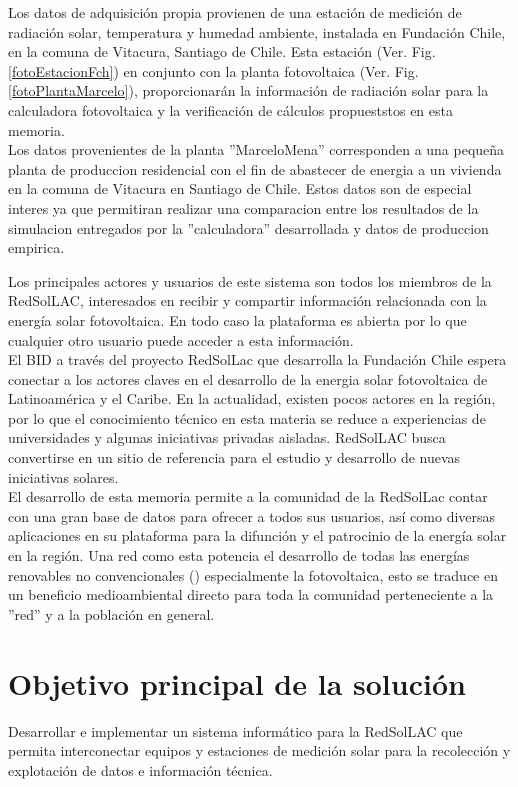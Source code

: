 Los datos de adquisición propia provienen de una estación de medición de radiación solar, temperatura y humedad ambiente, instalada en Fundación Chile, en la comuna de Vitacura, Santiago de Chile. Esta estación (Ver. Fig.\ref{fotoEstacionFch}) en conjunto con la planta fotovoltaica (Ver. Fig. \ref{fotoPlantaMarcelo}), proporcionarán la información de radiación solar para la calculadora fotovoltaica y la verificación de cálculos propueststos en esta memoria.\\
Los datos provenientes de la planta ''MarceloMena'' corresponden a una pequeña planta de produccion residencial con el fin de abastecer de energia a un vivienda en la comuna de Vitacura en Santiago de Chile. Estos datos son de especial interes ya que permitiran realizar una comparacion entre los resultados de la simulacion entregados por la ''calculadora'' desarrollada y datos de produccion empirica.

Los principales actores y usuarios de este sistema son todos los miembros de la RedSolLAC, interesados en recibir y compartir información relacionada con la energía solar fotovoltaica. En todo caso la plataforma es abierta por lo que cualquier otro usuario puede acceder a esta información.\\

El BID a través del proyecto RedSolLac que desarrolla la Fundación Chile espera conectar a los actores claves en el desarrollo de la energia solar fotovoltaica de Latinoamérica y el Caribe. En la actualidad, existen pocos actores en la región, por lo que el conocimiento técnico en esta materia se reduce a experiencias de universidades y algunas iniciativas privadas aisladas. RedSolLAC busca convertirse en un sitio de referencia para el estudio y desarrollo de nuevas iniciativas solares.\\

El desarrollo de esta memoria permite a la comunidad de la RedSolLac contar con una gran base de datos para ofrecer a todos sus usuarios, así como diversas aplicaciones en su plataforma para la difunción y el patrocinio de la energía solar en la región. Una red como esta potencia el desarrollo de todas las energías renovables no convencionales () especialmente la fotovoltaica, esto se traduce en un beneficio medioambiental directo para toda la comunidad perteneciente a la ''red'' y a la población en general.

\section{Objetivo principal de la solución}
Desarrollar e implementar un sistema informático para la RedSolLAC que permita interconectar equipos y estaciones de medición solar para la recolección y explotación de datos e información técnica.

